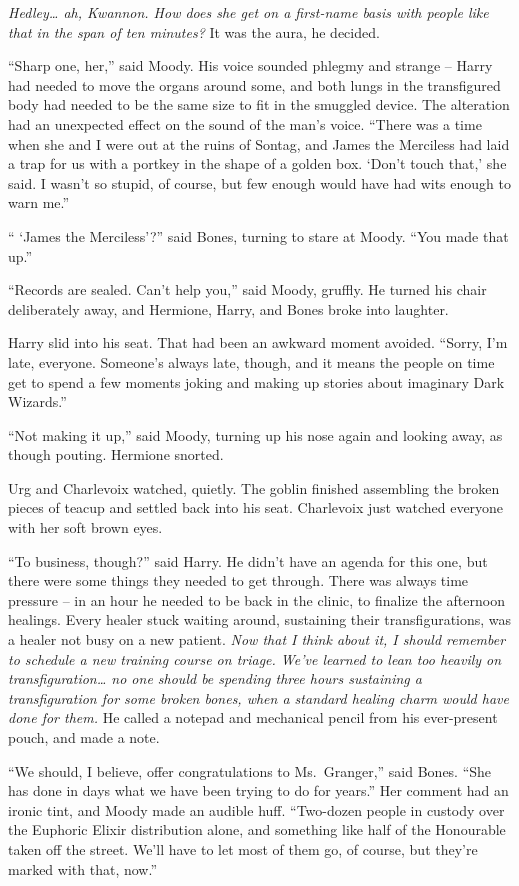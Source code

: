 \emph{Hedley\ldots{} ah, Kwannon. How does she get on a first-name basis
with people like that in the span of ten minutes?} It was the aura, he
decided.

``Sharp one, her,'' said Moody. His voice sounded phlegmy and strange --
Harry had needed to move the organs around some, and both lungs in the
transfigured body had needed to be the same size to fit in the smuggled
device. The alteration had an unexpected effect on the sound of the
man's voice. ``There was a time when she and I were out at the ruins of
Sontag, and James the Merciless had laid a trap for us with a portkey in
the shape of a golden box. `Don't touch that,' she said. I wasn't so
stupid, of course, but few enough would have had wits enough to warn
me.''

`` `James the Merciless'?'' said Bones, turning to stare at Moody. ``You
made that up.''

``Records are sealed. Can't help you,'' said Moody, gruffly. He turned
his chair deliberately away, and Hermione, Harry, and Bones broke into
laughter.

Harry slid into his seat. That had been an awkward moment avoided.
``Sorry, I'm late, everyone. Someone's always late, though, and it means
the people on time get to spend a few moments joking and making up
stories about imaginary Dark Wizards.''

``Not making it up,'' said Moody, turning up his nose again and looking
away, as though pouting. Hermione snorted.

Urg and Charlevoix watched, quietly. The goblin finished assembling the
broken pieces of teacup and settled back into his seat. Charlevoix just
watched everyone with her soft brown eyes.

``To business, though?'' said Harry. He didn't have an agenda for this
one, but there were some things they needed to get through. There was
always time pressure -- in an hour he needed to be back in the clinic,
to finalize the afternoon healings. Every healer stuck waiting around,
sustaining their transfigurations, was a healer not busy on a new
patient. \emph{Now that I think about it, I should remember to schedule
a new training course on triage. We've learned to lean too heavily on
transfiguration\ldots{} no one should be spending three hours sustaining
a transfiguration for some broken bones, when a standard healing charm
would have done for them.} He called a notepad and mechanical pencil
from his ever-present pouch, and made a note.

``We should, I believe, offer congratulations to Ms.~Granger,'' said
Bones. ``She has done in days what we have been trying to do for
years.'' Her comment had an ironic tint, and Moody made an audible huff.
``Two-dozen people in custody over the Euphoric Elixir distribution
alone, and something like half of the Honourable taken off the street.
We'll have to let most of them go, of course, but they're marked with
that, now.''

